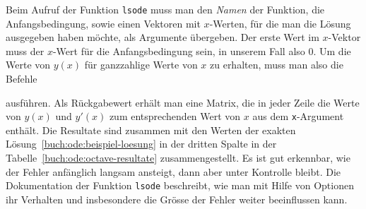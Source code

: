 Beim Aufruf der Funktion \texttt{lsode} muss man den {\em Namen}
der Funktion, die Anfangsbedingung, sowie einen Vektoren mit $x$-Werten,
für die man die Lösung ausgegeben haben möchte, als Argumente
übergeben.
Der erste Wert im $x$-Vektor muss der $x$-Wert für die Anfangsbedingung
sein, in unserem Fall also $0$.
Um die Werte von $y(x)$ für ganzzahlige Werte von $x$ zu erhalten,
muss man also die Befehle

ausführen.
Als Rückgabewert erhält man eine Matrix, die in jeder Zeile die
Werte von $y(x)$ und $y'(x)$ zum entsprechenden Wert von $x$
aus dem \texttt{x}-Argument enthält.
Die Resultate sind zusammen mit den Werten der exakten
Lösung~\eqref{buch:ode:beispiel-loesung} in der dritten Spalte 
in der Tabelle~\ref{buch:ode:octave-resultate} zusammengestellt.
Es ist gut erkennbar, wie der Fehler anfänglich langsam ansteigt,
dann aber unter Kontrolle bleibt.
Die Dokumentation der Funktion \texttt{lsode} beschreibt, wie man mit
Hilfe von Optionen ihr Verhalten und insbesondere die Grösse der
Fehler weiter beeinflussen kann.
